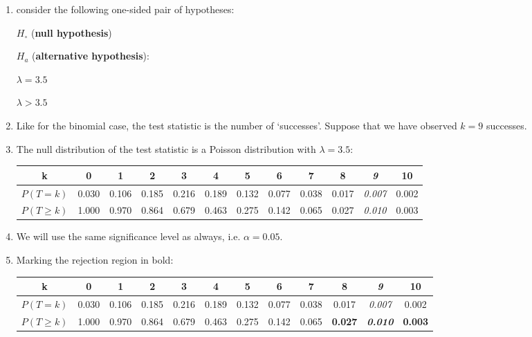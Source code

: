 \begin{enumerate}
\item consider the following one-sided pair of hypotheses:

  \noindent\begin{minipage}{.4\textwidth}
    $H_\circ$ (\textbf{null hypothesis})
    
    \vspace{1em}
    
    $H_a$ (\textbf{alternative hypothesis}):
  \end{minipage}
  \begin{minipage}{.2\textwidth}
  \end{minipage}
  \begin{minipage}{.2\textwidth}
    $\lambda = 3.5$
    
    \vspace{1em}
    
    $\lambda>{3.5}$
  \end{minipage}
  \begin{minipage}{.2\textwidth}
  \end{minipage}\medskip

\item Like for the binomial case, the test statistic is the number of
  `successes'.  Suppose that we have observed $k=9$ successes.

\item The null distribution of the test statistic is a Poisson
  distribution with $\lambda={3.5}$:
  
  \begin{tabular}{c@{~}c@{~}c@{~}c@{~}c@{~}c@{~}c@{~}c@{~}c@{~}c@{~}c@{~}c}
    k & 0 & 1 & 2 & 3 & 4 & 5 & 6 & 7 & 8 & \textit{9} & 10 \\ \hline
    $P(T=k)$ & 0.030 & 0.106 & 0.185 & 0.216 & 0.189 &
    0.132 & 0.077 & 0.038 & 0.017 & \textit{0.007} & 0.002 \\
    $P({T}\geq{k})$ & 1.000 & 0.970 & 0.864 & 0.679 & 0.463 &
    0.275 & 0.142 & 0.065 & 0.027 & \textit{0.010} & 0.003 \\
  \end{tabular}

\item We will use the same significance level as always,
  i.e. $\alpha=0.05$.

\item Marking the rejection region in bold:

  \begin{tabular}{c@{~}c@{~}c@{~}c@{~}c@{~}c@{~}c@{~}c@{~}c@{~}c@{~}c@{~}c}
    k & 0 & 1 & 2 & 3 & 4 & 5 & 6 & 7 & \textbf{8} &
    \textbf{\textit{9}} & \textbf{10} \\ \hline
    $P(T=k)$ & 0.030 & 0.106 & 0.185 & 0.216 & 0.189 &
    0.132 & 0.077 & 0.038 & 0.017 & \textit{0.007} & 0.002 \\
    $P({T}\geq{k})$ & 1.000 & 0.970 & 0.864 & 0.679 & 0.463 &
    0.275 & 0.142 & 0.065 & \textbf{0.027} & \textbf{\textit{0.010}} &
    \textbf{0.003} \\
  \end{tabular}


\end{enumerate}
